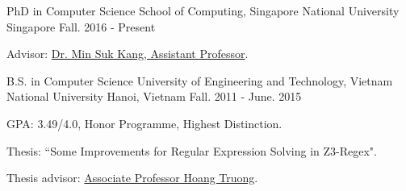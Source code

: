 


\begin{cventries}

  \cventry
    {PhD in Computer Science} %
    {School of Computing, Singapore National University} %
    {Singapore} %
    {Fall. 2016 - Present} %
    {
      \begin{cvitems} %
        \item {Advisor: \href{http://www.comp.nus.edu.sg/~kangms/}{Dr. Min Suk Kang, Assistant Professor}.}
      \end{cvitems}
    }

  \cventry
    {B.S. in Computer Science} %
    {University of Engineering and Technology, Vietnam National University} %
    {Hanoi, Vietnam} %
    {Fall. 2011 - June. 2015} %
    {
      \begin{cvitems} %
        \item {GPA: 3.49/4.0, Honor Programme, Highest Distinction.}
        \item {Thesis: “Some Improvements for Regular Expression Solving in Z3-Regex".}
        \item {Thesis advisor: \href{http://www.uet.vnu.edu.vn/~hoangta/}{Associate Professor Hoang Truong}.}
      \end{cvitems}
    }


\end{cventries}
